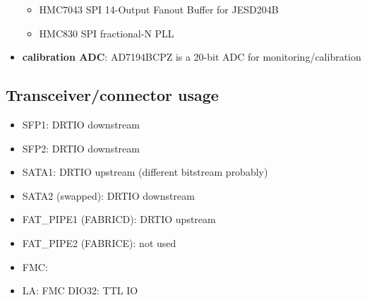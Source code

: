 \begin{itemize}
  \begin{itemize}

  \item
    HMC7043 SPI 14-Output Fanout Buffer for JESD204B
  \item
    HMC830 SPI fractional-N PLL
  \end{itemize}
\item
  \textbf{calibration ADC}: AD7194BCPZ is a 20-bit ADC for
  monitoring/calibration
\end{itemize}

\subsection{Transceiver/connector
usage}\label{transceiverconnector-usage}

\begin{itemize}

\item
  SFP1: DRTIO downstream
\item
  SFP2: DRTIO downstream
\item
  SATA1: DRTIO upstream (different bitstream probably)
\item
  SATA2 (swapped): DRTIO downstream
\item
  FAT\_PIPE1 (FABRICD): DRTIO upstream
\item
  FAT\_PIPE2 (FABRICE): not used
\item
  FMC:
\item
  LA: FMC DIO32: TTL IO
\end{itemize}


